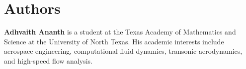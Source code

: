 \documentclass[10pt]{article}
\begin{document}

\section{Authors}

\textbf{Adhvaith Ananth} is a student at the Texas Academy of
Mathematics and Science at the University of North Texas. His academic
interests include aerospace engineering, computational fluid dynamics,
transonic aerodynamics, and high-speed flow analysis.
\end{document}
